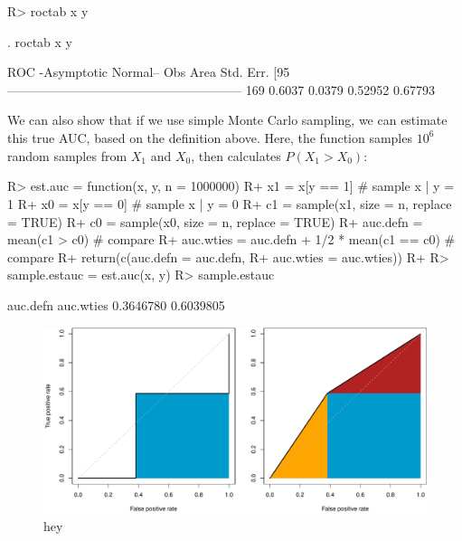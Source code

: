 \documentclass[article]{jss}
\begin{document}
\begin{CodeChunk}

\begin{CodeInput}
R> roctab x y
\end{CodeInput}


\begin{CodeOutput}
 . roctab x y

                      ROC                    -Asymptotic Normal--
           Obs       Area     Std. Err.      [95%
         --------------------------------------------------------
           169     0.6037       0.0379        0.52952     0.67793
\end{CodeOutput}
\end{CodeChunk}

We can also show that if we use simple Monte Carlo sampling, we can
estimate this true AUC, based on the definition above. Here, the
function  samples \(10^{6}\) random samples from \(X_{1}\)
and \(X_{0}\), then calculates \(\hat{P}(X_{1} > X_{0})\):

\begin{CodeChunk}

\begin{CodeInput}
R> est.auc = function(x, y, n = 1000000) {
R+   x1 = x[y == 1] # sample x | y = 1
R+   x0 = x[y == 0] # sample x | y = 0
R+   c1 = sample(x1, size = n, replace = TRUE)
R+   c0 = sample(x0, size = n, replace = TRUE)
R+   auc.defn = mean(c1 > c0) # compare
R+   auc.wties = auc.defn + 1/2 * mean(c1 == c0) # compare
R+   return(c(auc.defn = auc.defn,
R+            auc.wties = auc.wties))
R+ }
R> sample.estauc = est.auc(x, y)
R> sample.estauc
\end{CodeInput}

\begin{CodeOutput}
 auc.defn auc.wties 
0.3646780 0.6039805 
\end{CodeOutput}
\end{CodeChunk}

\begin{CodeChunk}
\begin{figure}

{\centering \includegraphics{index_files/figure-latex/unnamed-chunk-19-1} 

}

\caption[hey]{hey}\label{fig:unnamed-chunk-19}
\end{figure}
\end{CodeChunk}
\end{document}
